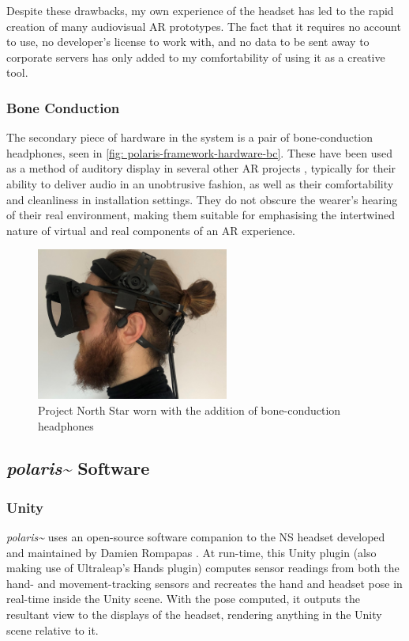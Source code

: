 Despite these drawbacks, my own experience of the headset has led to the rapid creation of many audiovisual AR prototypes. The fact that it requires no account to use, no developer’s license to work with, and no data to be sent away to corporate servers has only added to my comfortability of using it as a creative tool.

\subsubsection{Bone Conduction}\label{sec: polaris-framework-hardware-bc}
The secondary piece of hardware in the system is a pair of bone-conduction headphones, seen in \autoref{fig: polaris-framework-hardware-bc}. These have been used as a method of auditory display in several other AR projects \citep{lindeman2008,barde2016,chevalier2018}, typically for their ability to deliver audio in an unobtrusive fashion, as well as their comfortability and cleanliness in installation settings. They do not obscure the wearer’s hearing of their real environment, making them suitable for emphasising the intertwined nature of virtual and real components of an AR experience.
\begin{figure}
    \centering
    \includegraphics[height=5cm]{figures/06-polaris/polaris-framework-hardware-bc.jpg}
    \caption{Project North Star worn with the addition of bone-conduction headphones}
    \label{fig: polaris-framework-hardware-bc}
\end{figure}

\subsection{\textit{polaris\textasciitilde{}} Software}\label{sec: polaris-framework-software}
\subsubsection{Unity}\label{sec: polaris-framework-software-unity}
\textit{polaris\textasciitilde{}} uses an open-source software companion to the NS headset developed and maintained by Damien Rompapas \citeyearpar{rompapas2020}. At run-time, this Unity plugin (also making use of Ultraleap’s Hands plugin) computes sensor readings from both the hand- and movement-tracking sensors and recreates the hand and headset pose in real-time inside the Unity scene. With the pose computed, it outputs the resultant view to the displays of the headset, rendering anything in the Unity scene relative to it.

